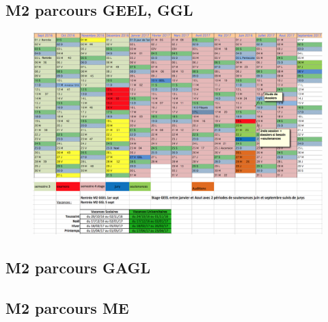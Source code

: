 \documentclass[a4paper,11pt]{article}
\begin{document}
\subsection{M2 parcours GEEL, GGL}
\begin{figure}[H]
	\centering
		\includegraphics[width=1.4\textwidth, angle=90]{Calendriers/calendrierM2.png}
	\label{calM2}
\end{figure}

\subsection{M2 parcours GAGL}

\subsection{M2 parcours ME}
\end{document}
